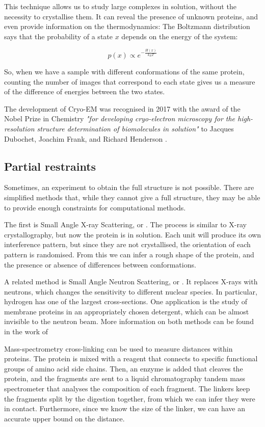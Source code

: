 This technique allows us to study large complexes in solution, without the necessity to crystallise them.
It can reveal the presence of unknown proteins, and even provide information on the thermodynamics:
The Boltzmann distribution says that the probability of a state $x$ depends on the energy of the system:

\begin{equation*}
p(x) \propto e^{-\frac{H(x)}{k_B T}}
\end{equation*}

So, when we have a sample with different conformations of the same protein, counting the number of images that correspond to each state gives us a measure of the difference of energies between the two states.

The development of Cryo-EM was recognised in 2017 with the award of the Nobel Prize in Chemistry \emph{"for developing cryo-electron microscopy for the high-resolution structure determination of biomolecules in solution"} to Jacques Dubochet, Joachim Frank, and Richard Henderson  \citep{cryoEM_nobel}.


\subsection{Partial restraints}
Sometimes, an experiment to obtain the full structure is not possible.
There are simplified methods that, while they cannot give a full structure, they may be able to provide enough constraints for computational methods.

The first is Small Angle X-ray Scattering, or \SAXS. \marginpar{\SAXS}
The process is similar to X-ray crystallography, but now the protein is in solution.
Each unit will produce its own interference pattern, but since they are not crystallised, the orientation of each pattern is randomised.
From this we can infer a rough shape of the protein, and the presence or absence of differences between conformations.

A related method is Small Angle Neutron Scattering, or \SANS. \marginpar{\SANS}
It replaces X-rays with neutrons, which changes the sensitivity to different nuclear species.
In particular, hydrogen has one of the largest cross-sections.
One application is the study of membrane proteins in an appropriately chosen detergent, which can be almost invisible to the neutron beam.
More information on both methods can be found in the work of~\citet{sax}

Mass-spectrometry cross-linking \citep{cross_linking}  can be used to measure distances within proteins.
The protein is mixed with a reagent that connects to specific functional groups of amino acid side chains.
Then, an enzyme is added that cleaves the protein, and the fragments are sent to a liquid chromatography tandem mass spectrometer that analyses the composition of each fragment.
The linkers keep the fragments split by the digestion together, from which we can infer they were in contact.
Furthermore, since we know the size of the linker, we can have an accurate upper bound on the distance.
